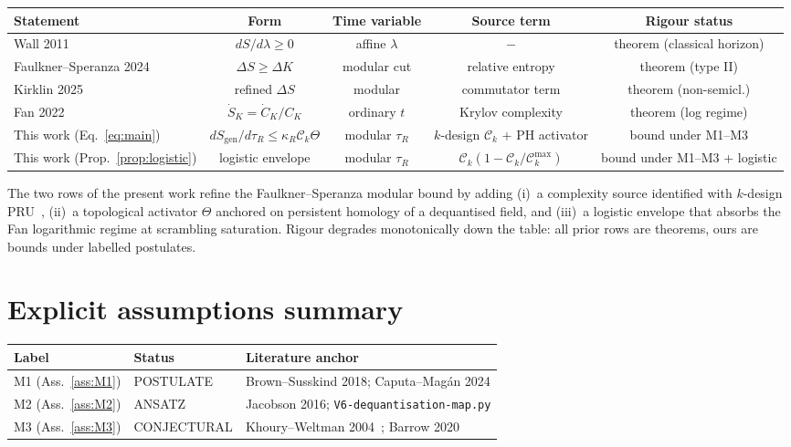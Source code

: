 \documentclass[aps,prd,superscriptaddress,nofootinbib,floatfix,10pt]{revtex4-2}
\theoremstyle{remark}
\newcommand{\Sgen}{S_{\mathrm{gen}}}
\newcommand{\tauR}{\tau_{R}}
\newcommand{\kR}{\kappa_{R}}
\newcommand{\Ck}{\mathcal{C}_{k}}
\begin{document}
\begin{center}
\small
\begin{tabular}{lcccc}
\hline
Statement & Form & Time variable & Source term & Rigour status \\
\hline
Wall 2011~\cite{Wall2011}            & $dS/d\lambda\ge 0$     & affine $\lambda$ & $-$               & theorem (classical horizon) \\
Faulkner--Speranza 2024~\cite{FaulknerSperanza2024}
                                     & $\Delta S\ge\Delta K$   & modular cut      & relative entropy  & theorem (type II) \\
Kirklin 2025~\cite{Kirklin2025}      & refined $\Delta S$      & modular          & commutator term   & theorem (non-semicl.) \\
Fan 2022~\cite{Fan2022}              & $\dot S_{K}=\dot C_{K}/C_{K}$ & ordinary $t$   & Krylov complexity & theorem (log regime) \\
This work (Eq.~\ref{eq:main})        & $d\Sgen/d\tauR\le\kR\Ck\Theta$ & modular $\tauR$ & $k$-design $\Ck$ + PH activator & bound under M1--M3 \\
This work (Prop.~\ref{prop:logistic})
                                     & logistic envelope       & modular $\tauR$  & $\Ck(1-\Ck/\Ck^{\max})$ & bound under M1--M3 + logistic \\
\hline
\end{tabular}
\end{center}

The two rows of the present work refine the Faulkner--Speranza
modular bound by adding (i)~a complexity source identified with
$k$-design PRU~\cite{MaHuang2025}, (ii)~a topological activator
$\Theta$ anchored on persistent homology of a dequantised field, and
(iii)~a logistic envelope that absorbs the Fan logarithmic regime at
scrambling saturation. Rigour degrades monotonically down the table:
all prior rows are theorems, ours are bounds under labelled
postulates.

\section{Explicit assumptions summary}
\label{sec:assumptions}

\begin{center}
\begin{tabular}{lll}
\hline
Label & Status & Literature anchor \\
\hline
M1 (Ass.~\ref{ass:M1})  & POSTULATE    & Brown--Susskind 2018;
                                        Caputa--Mag\'an 2024 \\
M2 (Ass.~\ref{ass:M2})  & ANSATZ       & Jacobson 2016;
                                        \texttt{V6-dequantisation-map.py} \\
M3 (Ass.~\ref{ass:M3})  & CONJECTURAL  & Khoury--Weltman 2004~\cite{KhouryWeltman2004};
                                        Barrow 2020 \\
\hline
\end{tabular}
\end{center}
\end{document}
